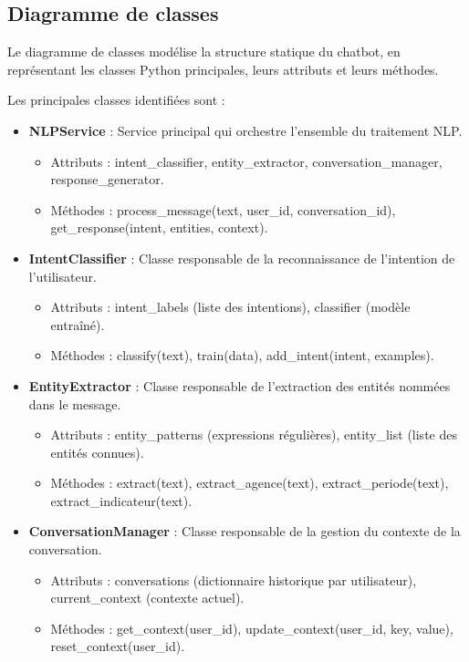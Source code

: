 \subsection{Diagramme de classes}
\label{subsec:sprint6-classes}

Le diagramme de classes modélise la structure statique du chatbot, en représentant les classes Python principales, leurs attributs et leurs méthodes.

Les principales classes identifiées sont :

\begin{itemize}
    \item \textbf{NLPService} : Service principal qui orchestre l'ensemble du traitement NLP.
        \begin{itemize}
            \item Attributs : intent\_classifier, entity\_extractor, conversation\_manager, response\_generator.
            \item Méthodes : process\_message(text, user\_id, conversation\_id), get\_response(intent, entities, context).
        \end{itemize}
    
    \item \textbf{IntentClassifier} : Classe responsable de la reconnaissance de l'intention de l'utilisateur.
        \begin{itemize}
            \item Attributs : intent\_labels (liste des intentions), classifier (modèle entraîné).
            \item Méthodes : classify(text), train(data), add\_intent(intent, examples).
        \end{itemize}
    
    \item \textbf{EntityExtractor} : Classe responsable de l'extraction des entités nommées dans le message.
        \begin{itemize}
            \item Attributs : entity\_patterns (expressions régulières), entity\_list (liste des entités connues).
            \item Méthodes : extract(text), extract\_agence(text), extract\_periode(text), extract\_indicateur(text).
        \end{itemize}
    
    \item \textbf{ConversationManager} : Classe responsable de la gestion du contexte de la conversation.
        \begin{itemize}
            \item Attributs : conversations (dictionnaire historique par utilisateur), current\_context (contexte actuel).
            \item Méthodes : get\_context(user\_id), update\_context(user\_id, key, value), reset\_context(user\_id).
        \end{itemize}
    

\end{itemize}
